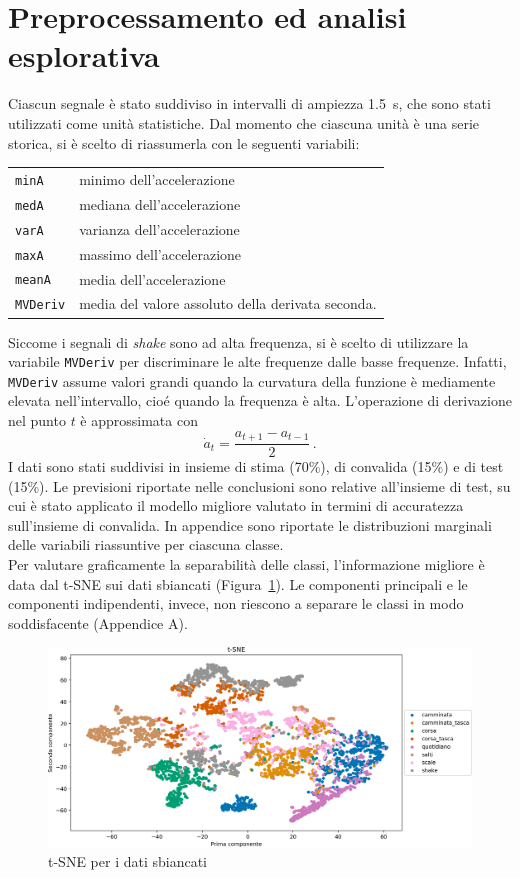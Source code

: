 \documentclass[./main.tex]{subfiles}
\begin{document}
\section{Preprocessamento ed analisi esplorativa}
Ciascun segnale è stato suddiviso in intervalli di ampiezza \SI{1.5}{s}, che sono stati utilizzati come unità statistiche. Dal momento che ciascuna unità è una serie storica, si è scelto di riassumerla con le seguenti variabili:
\begin{table}[H]
	\centering
	\begin{tabular}{ll}
		\texttt{minA}& minimo dell'accelerazione\\
		\texttt{medA}& mediana dell'accelerazione\\
		\texttt{varA}& varianza dell'accelerazione\\
		\texttt{maxA}& massimo dell'accelerazione\\
		\texttt{meanA}& media dell'accelerazione\\
		\texttt{MVDeriv}& media del valore assoluto della derivata seconda.
	\end{tabular}
\end{table}
Siccome i segnali di {\em shake} sono ad alta frequenza, si è scelto di utilizzare la variabile \texttt{MVDeriv} per discriminare le alte frequenze dalle basse frequenze. Infatti, \texttt{MVDeriv} assume valori grandi quando la curvatura della funzione è mediamente elevata nell'intervallo, cioé quando la frequenza è alta. L'operazione di derivazione nel punto $t$ è approssimata con\cite{NumpyGradientNumPy}
\[
\dot{a}_t = \dfrac{a_{t + 1} - a_{t - 1}}{2}\,.
\]
I dati sono stati suddivisi in insieme di stima (70\%), di convalida (15\%) e di test (15\%). Le previsioni riportate nelle conclusioni sono relative all'insieme di test, su cui è stato applicato il modello migliore valutato in termini di accuratezza sull\rq{}insieme di convalida.
In appendice sono riportate le distribuzioni marginali delle variabili riassuntive per ciascuna classe.\\

Per valutare graficamente la separabilità delle classi, l'informazione migliore è data dal t-SNE sui dati sbiancati (Figura~\ref{fig:tsne}). Le componenti principali e le componenti indipendenti, invece, non riescono a separare le classi in modo soddisfacente (Appendice A).
\begin{figure}[H]
	\centering
	\includegraphics[width=.8\textwidth]{../../figure/t-SNE.png}
	\caption{{ t-SNE per i dati sbiancati}}
	\label{fig:tsne}
\end{figure}
\end{document}
